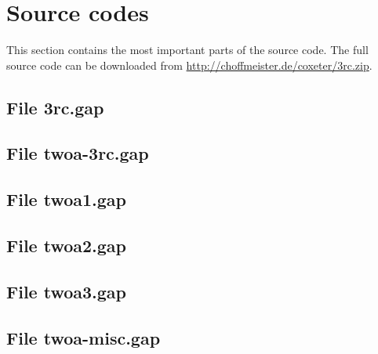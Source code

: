 \chapter{Source codes}
\label{sec:sourcecodes}

This section contains the most important parts of the source code. The full source code can be downloaded from \url{http://choffmeister.de/coxeter/3rc.zip}.

\section*{File 3rc.gap}
\label{file:3rc}


\section*{File twoa-3rc.gap}
\label{file:twoa-3rc}


\section*{File twoa1.gap}
\label{file:twoa1}


\section*{File twoa2.gap}
\label{file:twoa2}


\section*{File twoa3.gap}
\label{file:twoa3}


\section*{File twoa-misc.gap}
\label{file:twoa-misc}
